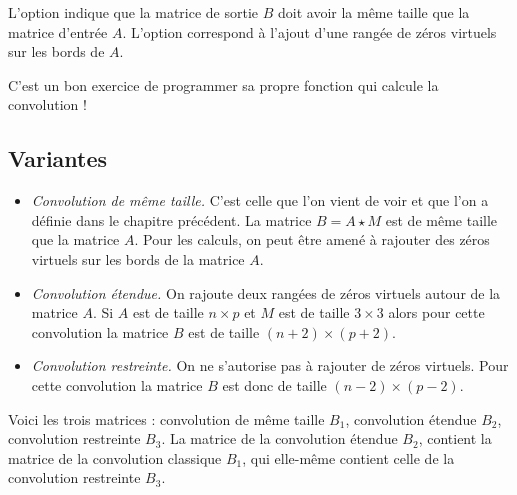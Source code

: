 \documentclass[11pt,class=report,crop=false]{standalone}
\begin{document}
L'option  indique que la matrice de sortie $B$ doit avoir la même taille que la matrice d'entrée $A$.
L'option  correspond à l'ajout d'une rangée de zéros virtuels sur les bords de $A$.

C'est un bon exercice de programmer sa propre fonction qui calcule la convolution !

\subsection{Variantes}

\begin{itemize}
  \item \emph{Convolution de même taille.}
  C'est celle que l'on vient de voir et que l'on a définie dans le chapitre précédent. La matrice $B = A \star M$ est de même taille que la matrice $A$. Pour les calculs, on peut être amené à rajouter des zéros virtuels sur les bords de la matrice $A$.


  
  \item \emph{Convolution étendue.} On rajoute deux rangées de zéros virtuels autour de la matrice $A$. Si $A$ est de taille $n\times p$ et $M$ est de taille $3\times 3$ alors pour cette convolution la matrice $B$ est de taille $(n+2) \times (p+2)$.
  


    
  \item\emph{Convolution restreinte.} On ne s'autorise pas à rajouter de zéros virtuels. Pour cette convolution la matrice $B$ est donc de taille $(n-2) \times (p-2)$. 
  
  

    
\end{itemize}

Voici les trois matrices : convolution de même taille $B_1$, convolution étendue $B_2$, convolution restreinte $B_3$. La matrice de la convolution étendue $B_2$, contient la matrice de la convolution classique $B_1$, qui elle-même contient celle de la convolution restreinte $B_3$. 
\end{document}
